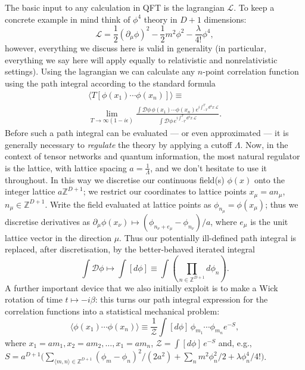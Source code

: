 \documentclass[twocolumn,lengthcheck,superscriptaddress]{revtex4-1}
\theoremstyle{definition}
\theoremstyle{remark}
\begin{document}
The basic input to any calculation in QFT is the lagrangian $\mathcal{L}$. To keep a concrete example in mind think of $\phi^4$ theory in $D+1$ dimensions:
\begin{equation}
	\mathcal{L} = \frac12 (\partial_\mu\phi)^2 - \frac12m^2 \phi^2 -\frac{\lambda}{4!}\phi^4,
\end{equation}
however, everything we discuss here is valid in generality (in particular, everything we say here will apply equally to relativistic and nonrelativistic settings).  Using the lagrangian we can calculate any $n$-point correlation function using the path integral according to the standard formula
\begin{multline}	
	\langle  T[\phi(x_1)\cdots \phi(x_n)] \rangle\equiv\\ \lim_{T\rightarrow \infty(1-i\epsilon)} \frac{\int \mathcal{D}\phi \, \phi(x_1)\cdots \phi(x_n)e^{i\int_{-T}^T d^4x\, \mathcal{L}}}{\int \mathcal{D}\phi\, e^{i\int_{-T}^T d^4x\, \mathcal{L}}}.
\end{multline} 
Before such a path integral can be evaluated --- or even approximated --- it is generally necessary to \emph{regulate} the theory by applying a cutoff $\Lambda$. Now, in the context of tensor networks and quantum information, the most natural regulator is the lattice, with lattice spacing $a = \frac{1}{\Lambda}$, and we don't hesitate to use it throughout. In this way we discretise our continuous field(s) $\phi(x)$ onto the integer lattice $a\mathbb{Z}^{D+1}$; we restrict our coordinates to lattice points $x_\mu = an_\mu$, $n_\mu \in \mathbb{Z}^{D+1}$. Write the field evaluated at lattice points as $\phi_{n_{\mu}} = \phi(x_\mu)$; thus we discretise derivatives as $\partial_\mu \phi(x_\nu) \mapsto (\phi_{n_\nu + e_{\mu}} - \phi_{n_\nu})/a$,   where $e_\mu$ is the unit lattice vector in the direction $\mu$. Thus our potentially ill-defined path integral is replaced, after discretisation, by the better-behaved iterated integral
\begin{equation}
	\int \mathcal{D}\phi \mapsto \int [d\phi] \equiv \int \left(\prod_{n\in\mathbb{Z}^{D+1}} d\phi_n \right).
\end{equation}
A further important device that we also initially exploit is to make a Wick rotation of time $t\mapsto -i\beta$: this turns our path integral expression for the correlation functions into a statistical mechanical problem:
\begin{equation}\label{eq:wrcorr}
	\langle  \phi(x_{1})\cdots \phi(x_n) \rangle\equiv \frac{1}{\mathcal{Z}}\int [d\phi] \, \phi_{m_1}\cdots \phi_{m_n} e^{-S},
\end{equation} 
where $x_1 = a m_1, x_2 = a m_2, \ldots, x_1 = a m_n$, $\mathcal{Z} = \int [d\phi] \, e^{-S}$ and, e.g., $S = a^{D+1}\big(\sum_{\langle m,n\rangle\in \mathbb{Z}^{D+1}} (\phi_m-\phi_n)^2/(2a^2) + \sum_{n} m^2\phi_n^2/2 + \lambda \phi_n^4/4!\big)$.
\end{document}
